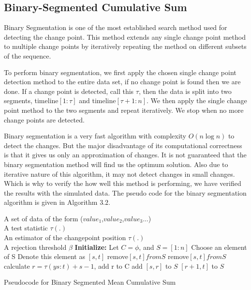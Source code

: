 \subsection{\label{Binary-Segmented Cumulative Sum}Binary-Segmented Cumulative Sum}
Binary Segmentation is one of the most established search method used for detecting the change point. This method extends any single change point method to multiple change points by iteratively repeating the method on different subsets of the sequence.\par 
To perform binary segmentation, we first apply the chosen single change point detection method to the entire data set, if no change point is found then we are done. If a change point is detected, call this $\tau$, then the data is split into two segments, timeline$[1:\tau]$ and timeline$[\tau+1:n]$. We then apply the single change point method to the two segments and repeat iteratively. We stop when no more change points are detected.\par
Binary segmentation is a very fast algorithm with complexity $O(n\log n)$ to detect the changes. But the major disadvantage of its computational correctness is that it gives us only an approximation of changes. It is not guaranteed that the binary segmentation method will find us the optimum solution. Also due to iterative nature of this algorithm, it may not detect changes in small changes. Which is why to verify the how well this method is performing, we have verified the results with the simulated data. 
The pseudo code for the binary segmentation algorithm is given in Algorithm $3.2$. 

\begin{algorithm}[!h]
	\begin{algorithmic}[1]
		 \State \algorithmicrequire A set of data of the form ($value_1$,$value_2$,$value_3$...)\\
		\qquad\quad\enspace A test statistic $\tau(.)$\\
		\qquad\quad\enspace An estimator of the changepoint position $\tau(.)$\\
		\qquad\quad\enspace A rejection threshold $\beta$
		\State\textbf{Initialize:} Let $C=\phi$, and $S=[1:n]$
			\State Choose an element of S
			\State Denote this element as $[s,t]$
				\State remove$[s,t] from S$
			\EndIf
				\State remove$[s,t] from S$
				\State calculate $ r=\tau(ys:t)+s-1 $, 
				\State add r to C
					\State add $[s,r]$ to $S$
				\EndIf
					\State $[r+1,t]$ to $S$
				\EndIf
			\EndIf
		\EndWhile	
		\caption{Pseudocode for Binary Segmented Mean Cumulative Sum}
		\label{Pseudocode for Binary Segmented Mean Cumulative Sum}
	\end{algorithmic}
\end{algorithm}

